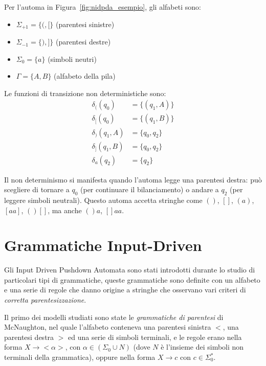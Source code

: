 \documentclass[a4paper,12pt]{report}
\theoremstyle{propositionstyle}
\begin{document}
    Per l'automa in Figura~\ref{fig:nidpda_esempio}, gli alfabeti sono:
    \begin{itemize}
        \item $\Sigma_{+1} = \{(, [\}$ (parentesi sinistre)
        \item $\Sigma_{-1} = \{), ]\}$ (parentesi destre)
        \item $\Sigma_0 = \{a\}$ (simboli neutri)
        \item $\Gamma = \{A, B\}$ (alfabeto della pila)
    \end{itemize}
    
    Le funzioni di transizione non deterministiche sono:
    \begin{align}
        \delta_{(}(q_0) &= \{(q_1, A)\} \\
        \delta_{[}(q_0) &= \{(q_1, B)\} \\
        \delta_{)}(q_1, A) &= \{q_0, q_2\} \\
        \delta_{]}(q_1, B) &= \{q_0, q_2\} \\
        \delta_{a}(q_2) &= \{q_2\}
    \end{align}
    
    Il non determinismo si manifesta quando l'automa legge una parentesi destra: può scegliere di tornare a $q_0$ (per continuare il bilanciamento) o andare a $q_2$ (per leggere simboli neutrali). Questo automa accetta stringhe come $()$, $[]$, $(a)$, $[aa]$, $()[]$, ma anche $()a$, $[]aa$.

    \section{Grammatiche Input-Driven}

    Gli Input Driven Pushdown Automata sono stati introdotti durante lo studio di particolari tipi di grammatiche, queste grammatiche sono definite
    con un alfabeto e una serie di regole che danno origine a stringhe che osservano vari criteri di \textit{corretta parentesizzazione}.
    
    Il primo dei modelli studiati sono state le \textit{grammatiche di parentesi} di McNaughton, nel quale l'alfabeto conteneva una parentesi sinistra $<$, una parentesi destra $>$
    ed una serie di simboli terminali, e le regole erano nella forma $X \rightarrow <\alpha>$, con $\alpha \in \left(\Sigma_0 \cup N\right)$ (dove $N$ è l'insieme dei simboli non terminali della grammatica), oppure nella forma $X \rightarrow c$ con $c \in \Sigma_0^*$.
    
\end{document}
